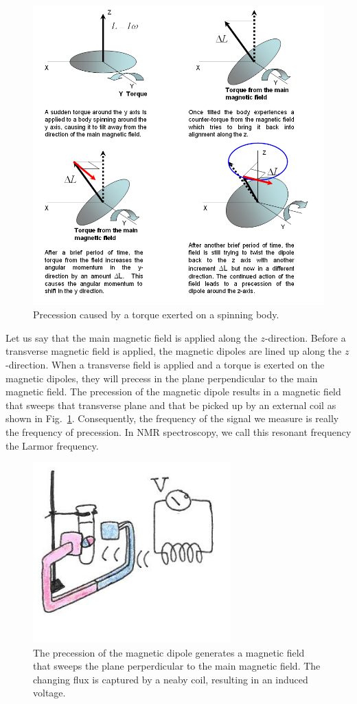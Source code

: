 \begin{figure}[!htb]
	\centering
	\includegraphics[width=\textwidth]{./figures/Topic9/Fig9-19.png}
	\caption{Precession caused by a torque exerted on a spinning body.}
 	\label{Fig9-19}
\end{figure} 

Let us say that the main magnetic field is applied along the $z$-direction. Before a transverse magnetic field is applied, the magnetic dipoles are lined up along the $z$-direction. When a transverse field is applied and a torque is exerted on the magnetic dipoles, they will precess in the plane perpendicular to the main magnetic field. The precession of the magnetic dipole results in a magnetic field that sweeps that transverse plane and that be picked up by an external coil as shown in Fig.~\ref{Fig9-19}. Consequently, the frequency of the signal we measure is really the frequency of precession.  In NMR spectroscopy, we call this resonant frequency the Larmor frequency.
\begin{figure}[!htb]
	\centering
	\includegraphics[width=3.0in]{./figures/Topic9/Fig9-20.jpg}
	\caption{The precession of the magnetic dipole generates a magnetic field that sweeps the plane perperdicular to the main magnetic field. The changing flux is captured by a neaby coil, resulting in an induced voltage. }
 	\label{Fig9-20}
\end{figure} 

